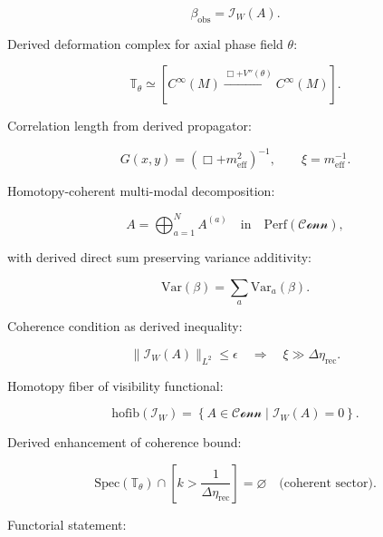 \documentclass[12pt]{article}
\begin{document}
\begin{equation}
\beta_{\mathrm{obs}}
=
\mathcal{I}_W(A).
\end{equation}

Derived deformation complex for axial phase field $\theta$:

\begin{equation}
\mathbb{T}_\theta
\simeq
\left[
C^\infty(M)
\xrightarrow{\Box + V''(\theta)}
C^\infty(M)
\right].
\end{equation}

Correlation length from derived propagator:

\begin{equation}
G(x,y)
=
\left(
\Box + m_{\mathrm{eff}}^2
\right)^{-1},
\qquad
\xi = m_{\mathrm{eff}}^{-1}.
\end{equation}

Homotopy-coherent multi-modal decomposition:

\begin{equation}
A
=
\bigoplus_{a=1}^N
A^{(a)}
\quad
\text{in}
\quad
\mathrm{Perf}(\mathcal{Conn}),
\end{equation}

with derived direct sum preserving variance additivity:

\begin{equation}
\mathrm{Var}(\beta)
=
\sum_a
\mathrm{Var}_a(\beta).
\end{equation}

Coherence condition as derived inequality:

\begin{equation}
\| \mathcal{I}_W(A) \|_{L^2}
\le
\epsilon
\quad
\Longrightarrow
\quad
\xi
\gg
\Delta\eta_{\mathrm{rec}}.
\end{equation}

Homotopy fiber of visibility functional:

\begin{equation}
\mathrm{hofib}(\mathcal{I}_W)
=
\left\{
A \in \mathcal{Conn}
\mid
\mathcal{I}_W(A)=0
\right\}.
\end{equation}

Derived enhancement of coherence bound:

\begin{equation}
\mathrm{Spec}
\left(
\mathbb{T}_\theta
\right)
\cap
\left[
k > \frac{1}{\Delta\eta_{\mathrm{rec}}}
\right]
=
\varnothing
\quad
\text{(coherent sector)}.
\end{equation}

Functorial statement:
\end{document}

